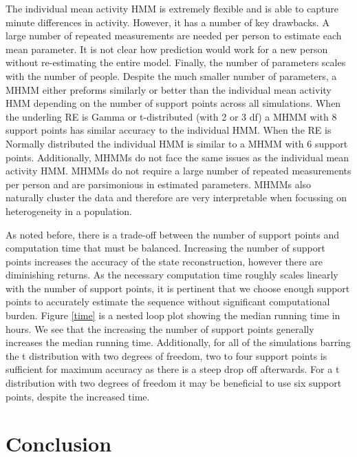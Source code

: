 \documentclass{article}
\begin{document}
The individual mean activity HMM is extremely flexible and is able to capture minute differences in activity. However, it has a number of key drawbacks. A large number of repeated measurements are needed per person to estimate each mean parameter. It is not clear how prediction would work for a new person without re-estimating the entire model. Finally, the number of parameters scales with the number of people. Despite the much smaller number of parameters, a MHMM either preforms similarly or better than the individual mean activity HMM depending on the number of support points across all simulations. When the underling RE is Gamma or t-distributed (with 2 or 3 df) a MHMM with 8 support points has similar accuracy to the individual HMM. When the RE is Normally distributed the individual HMM is similar to a MHMM with 6 support points. Additionally, MHMMs do not face the same issues as the individual mean activity HMM. MHMMs do not require a large number of repeated measurements per person and are parsimonious in estimated parameters. MHMMs also naturally cluster the data and therefore are very interpretable when focussing on heterogeneity in a population. 

As noted before, there is a trade-off between the number of 
support points and computation time that must be balanced. 
Increasing the number of support points increases the accuracy 
of the state reconstruction, however there are diminishing returns. 
As the necessary computation time roughly scales linearly with 
the number of support points, it is pertinent that we choose enough 
support points to accurately estimate the sequence without 
significant computational burden. Figure \ref{time} is a nested 
loop plot showing the median running time in hours. We see that 
the increasing the number of support points generally increases 
the median running time. Additionally, for all of the simulations 
barring the t distribution with two degrees of freedom, two to 
four support points is sufficient for maximum accuracy as there 
is a steep drop off afterwards. For a t distribution with two 
degrees of freedom it may be beneficial to use six support points, despite the increased time.

\section{Conclusion}
\end{document}
